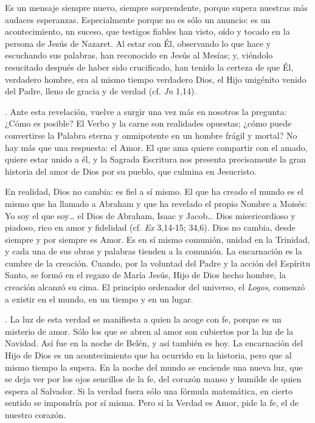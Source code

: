 Es un mensaje siempre nuevo, siempre sorprendente, porque supera nuestras más audaces esperanzas. Especialmente porque no es sólo un anuncio: es un acontecimiento, un suceso, que testigos fiables han visto, oído y tocado en la persona de Jesús de Nazaret. Al estar con Él, observando lo que hace y escuchando sus palabras, han reconocido en Jesús al Mesías; y, viéndolo resucitado después de haber sido crucificado, han tenido la certeza de que Él, verdadero hombre, era al mismo tiempo verdadero Dios, el Hijo unigénito venido del Padre, lleno de gracia y de verdad (cf. \emph{Jn} 1,14).

. Ante esta revelación, vuelve a surgir una vez más en nosotros la pregunta: ¿Cómo es posible? El Verbo y la carne son realidades opuestas; ¿cómo puede convertirse la Palabra eterna y omnipotente en un hombre frágil y mortal? No hay más que una respuesta: el Amor. El que ama quiere compartir con el amado, quiere estar unido a él, y la Sagrada Escritura nos presenta precisamente la gran historia del amor de Dios por su pueblo, que culmina en Jesucristo.

En realidad, Dios no cambia: es fiel a sí mismo. El que ha creado el mundo es el mismo que ha llamado a Abraham y que ha revelado el propio Nombre a Moisés: Yo soy el que soy\ldots{} el Dios de Abraham, Isaac y Jacob\ldots{} Dios misericordioso y piadoso, rico en amor y fidelidad (cf. \emph{Ex} 3,14-15; 34,6). Dios no cambia, desde siempre y por siempre es Amor. Es en sí mismo comunión, unidad en la Trinidad, y cada una de sus obras y palabras tienden a la comunión. La encarnación es la cumbre de la creación. Cuando, por la voluntad del Padre y la acción del Espíritu Santo, se formó en el regazo de María Jesús, Hijo de Dios hecho hombre, la creación alcanzó su cima. El principio ordenador del universo, el \emph{Logos}, comenzó a existir en el mundo, en un tiempo y en un lugar.

. La luz de esta verdad se manifiesta a quien la acoge con fe, porque es un misterio de amor. Sólo los que se abren al amor son cubiertos por la luz de la Navidad. Así fue en la noche de Belén, y así también es hoy. La encarnación del Hijo de Dios es un acontecimiento que ha ocurrido en la historia, pero que al mismo tiempo la supera. En la noche del mundo se enciende una nueva luz, que se deja ver por los ojos sencillos de la fe, del corazón manso y humilde de quien espera al Salvador. Si la verdad fuera sólo una fórmula matemática, en cierto sentido se impondría por sí misma. Pero si la Verdad es Amor, pide la fe, el  de nuestro corazón.

